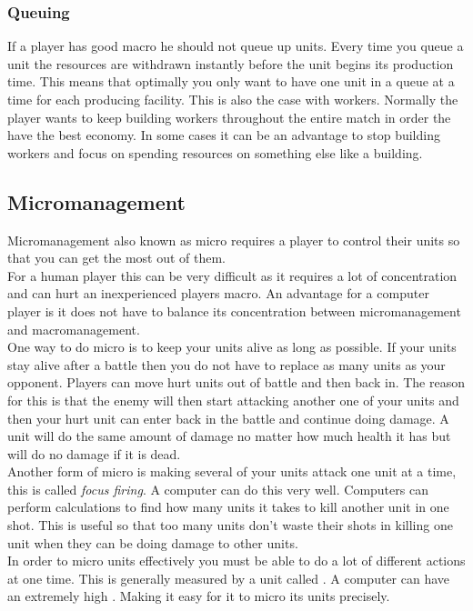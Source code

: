 			\subsubsection{Queuing}
				If a player has good macro he should not queue up units. 
				Every time you queue a unit the resources are withdrawn instantly before the unit begins its production time. This means that optimally you only want to have one unit in a queue at a time for each producing facility.
				This is also the case with workers. Normally the player wants to keep building workers throughout the entire match in order the have the best economy.
				In some cases it can be an advantage to stop building workers and focus on spending resources on something else like a building.
				
				
	\subsection{Micromanagement}
		Micromanagement also known as micro requires a player to control their units so that you can get the most out of them.\\
		
		For a human player this can be very difficult as it requires a lot of concentration and can hurt an inexperienced players macro. 
		An advantage for a computer player is it does not have to balance its concentration between micromanagement and macromanagement.\\
		
		One way to do micro is to keep your units alive as long as possible. 
		If your units stay alive after a battle then you do not have to replace as many units as your opponent. 
		Players can move hurt units out of battle and then back in. 
		The reason for this is that the enemy will then start attacking another one of your 
		units and then your hurt unit can enter back in the battle and continue doing damage. 
		A unit will do the same amount of damage no matter how much health it has but will do no damage if it is dead.\\
		
		Another form of micro is making several of your units attack one unit at a time, this is called \textit{focus firing}.
		A computer can do this very well. Computers can perform calculations to find how many units it takes to kill another unit in one shot.
		This is useful so that too many units don't waste their shots in killing one unit when they can be doing damage to other units.\\
		In order to micro units effectively you must be able to do a lot of different actions at one time. 
		This is generally measured by a unit called \abapm. 
		A computer can have an extremely high \abapm. Making it easy for it to micro its units precisely.

